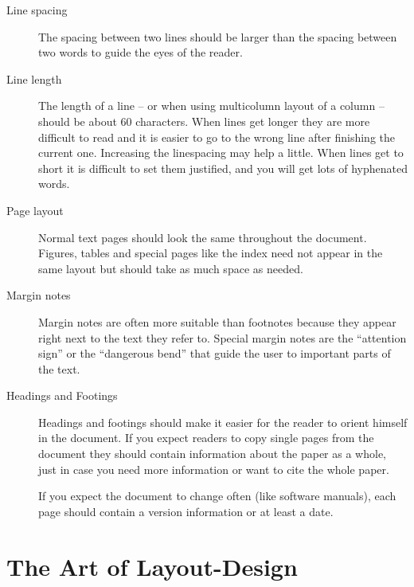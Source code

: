 \documentclass[twoside,a4paper]{refart}
\begin{document}
\begin{description}

\item[Line spacing]
        The spacing between two lines should be larger than the spacing 
        between two words to guide the eyes of the reader.

\item[Line length]
        The length of a line -- or when using multicolumn layout of a 
        column -- should be about 60 characters. When lines get longer they 
        are more difficult to read and it is easier to go to the wrong line 
        after finishing the current one. Increasing the linespacing may help a 
        little.
        When lines get to short it is difficult to set them justified, and you 
        will get lots of hyphenated words.
        
\item[Page layout]
        Normal text pages should look the same throughout the document. 
        Figures, tables and special pages like the index need not appear in 
        the same layout but should take as much space as needed.
        
\item[Margin notes]
        Margin notes are often more suitable than footnotes because they 
        appear right next to the text they refer to. Special margin notes are 
        the ``attention sign'' or the ``dangerous bend'' that guide the user 
        to important parts of the text.
        
\item[Headings and Footings]
        Headings and footings should make it easier for the reader to orient
        himself in the document. If you expect readers to copy single pages
        from the document they should contain information about the paper as
        a whole, just in case you need more information or want to cite the
        whole paper.
        
        If you expect the document to change often (like software manuals),
        each page should contain a version information or at least a date.
        
\end{description}

\section{The Art of Layout-Design}
\label{design}
\end{document}
